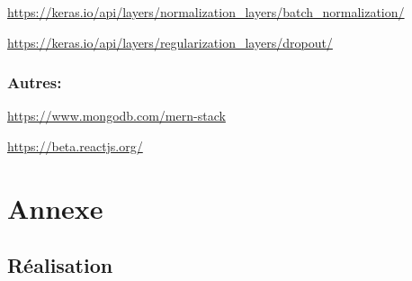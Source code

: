 \documentclass[12pt]{report}
\begin{document}
    \url{https://keras.io/api/layers/normalization_layers/batch_normalization/}

    \url{https://keras.io/api/layers/regularization_layers/dropout/}

    \subsection{Autres: }

    \url{https://www.mongodb.com/mern-stack}

    \url{https://beta.reactjs.org/}

    \chapter*{Annexe}\label{Annex}
    \section{Réalisation}
\end{document}
